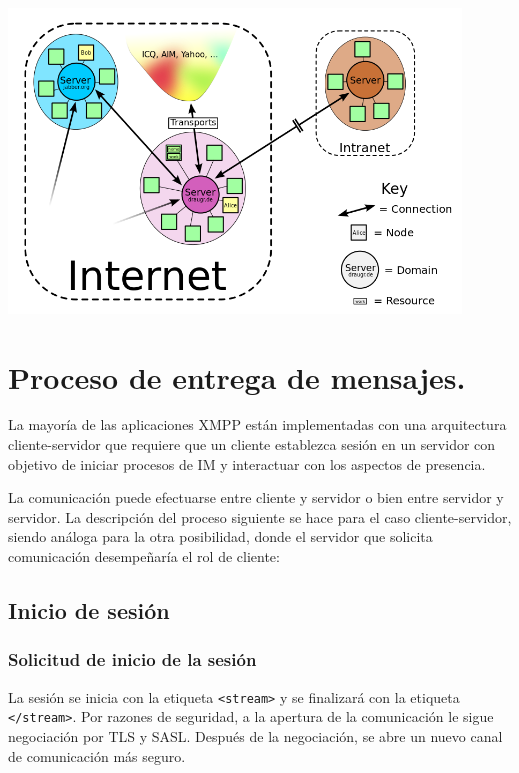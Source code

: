 \documentclass[a4paper, 11pt]{article} %
\begin{document}
      \begin{center}
      \includegraphics[width=12cm]{network.png}
      \end{center}
      
    
    
  \section {Proceso de entrega de mensajes.}
    La mayoría de las aplicaciones XMPP están implementadas con una arquitectura cliente-servidor que requiere que un cliente
    establezca sesión en un servidor con objetivo de iniciar procesos de IM y interactuar con los aspectos de presencia.
    
    La comunicación puede efectuarse entre cliente y servidor o bien entre servidor y servidor.
    La descripción del proceso siguiente se hace para el caso cliente-servidor, siendo análoga para la otra posibilidad, 
    donde el servidor que solicita comunicación desempeñaría el rol de cliente:
  
    \subsection{Inicio de sesión}
      \subsubsection{Solicitud de inicio de la sesión}
	La sesión se inicia con la etiqueta \texttt{<stream>} y se finalizará con la etiqueta
	\texttt{</stream>}. Por razones de seguridad, a la apertura de la comunicación le sigue
	negociación por TLS y SASL. Después de la negociación, se abre un nuevo canal de comunicación
	más seguro.
	
\end{document}
